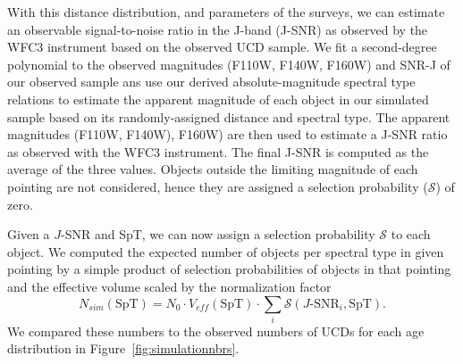 \documentclass[manuscript]{aastex63}
\begin{document}
With this distance distribution, and parameters of the surveys, we can estimate an observable signal-to-noise ratio in the J-band (J-SNR) as observed by the WFC3 instrument based on the observed UCD sample. We fit a second-degree polynomial to the observed magnitudes (F110W, F140W, F160W)  and SNR-J of our observed sample ans use our derived absolute-magnitude spectral type relations to estimate the apparent magnitude of each object in our simulated sample based on its randomly-assigned distance and spectral type. The apparent magnitudes (F110W, F140W), F160W) are then used to estimate a J-SNR ratio as observed with the WFC3 instrument. The final J-SNR is computed as the average of the three values. Objects outside the limiting magnitude of each pointing are not considered, hence they are assigned a selection probability ($\mathcal{S}$) of zero.

Given a $J$-SNR and SpT, we can now assign a selection probability $\mathcal{S}$ to each object. We computed the expected number of objects per spectral type in given pointing by a simple product of selection probabilities of objects in that pointing and the effective volume scaled by the normalization factor
\begin{equation}
N_{sim}(\text{SpT})= N_0 \cdot V_{eff} (\text{SpT}) \cdot \sum _i \mathcal{S}(J\text{-SNR}_i, \text{SpT}). \end{equation} 
We compared these numbers to the observed numbers of UCDs for each age distribution in Figure~\ref{fig:simulationnbrs}.
\end{document}
